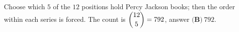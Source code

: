 Choose which $5$ of the $12$ positions hold Percy Jackson books; then the order within each series is forced. The count is $\dbinom{12}5=792$, answer $\boxed{\textbf{(B)}\ 792}$.

